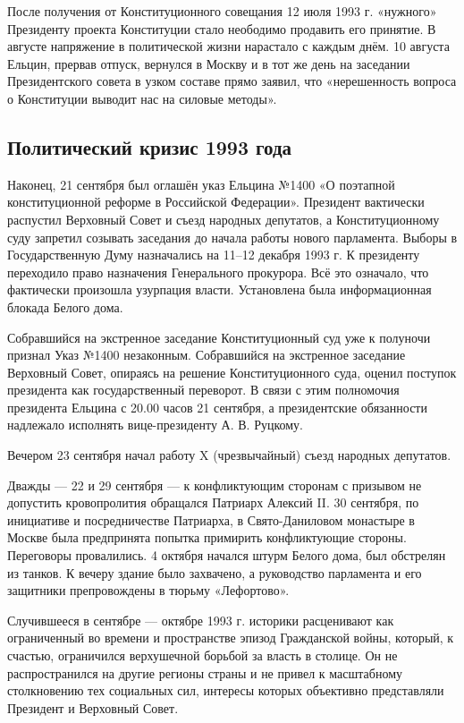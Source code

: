 После получения от Конституционного совещания 12 июля 1993 г. «нужного» Президенту проекта Конституции стало неободимо продавить его принятие. В августе напряжение в политической жизни нарастало с каждым днём. 10 августа Ельцин, прервав отпуск, вернулся в Москву и в тот же день на заседании Президентского совета в узком составе прямо заявил, что «нерешенность вопроса о Конституции выводит нас на силовые методы».

\subsection{Политический кризис 1993 года}

Наконец, 21 сентября был оглашён указ Ельцина №1400 «О поэтапной конституционной реформе в Российской Федерации». Президент вактически распустил Верховный Совет и съезд народных депутатов, а Конституционному суду запретил созывать заседания до начала работы нового парламента. Выборы в Государственную Думу назначались на 11–12 декабря 1993 г. К президенту переходило право назначения Генерального прокурора. Всё это означало, что фактически произошла узурпация власти. Установлена была информационная блокада Белого дома.

Собравшийся на экстренное заседание Конституционный суд уже к полуночи признал Указ №1400 незаконным. Собравшийся на экстренное заседание Верховный Совет, опираясь на решение Конституционного суда, оценил поступок президента как государственный переворот. В связи с этим полномочия президента Ельцина с 20.00 часов 21 сентября, а президентские обязанности надлежало исполнять вице-президенту А. В. Руцкому.

Вечером 23 сентября начал работу X (чрезвычайный) съезд народных депутатов.

Дважды — 22 и 29 сентября — к конфликтующим сторонам с призывом не допустить кровопролития обращался Патриарх Алексий II. 30 сентября, по инициативе и посредничестве Патриарха, в Свято-Даниловом монастыре в Москве была предпринята попытка примирить конфликтующие стороны. Переговоры провалились. 4 октября начался штурм Белого дома, был обстрелян из танков. К вечеру здание было захвачено, а руководство парламента и его защитники препровождены в тюрьму «Лефортово».

Случившееся в сентябре — октябре 1993 г. историки расценивают как ограниченный во времени и пространстве эпизод Гражданской войны, который, к счастью, ограничился верхушечной борьбой за власть в столице. Он не распространился на другие регионы страны и не привел к масштабному столкновению тех социальных сил, интересы которых объективно представляли Президент и Верховный Совет.

